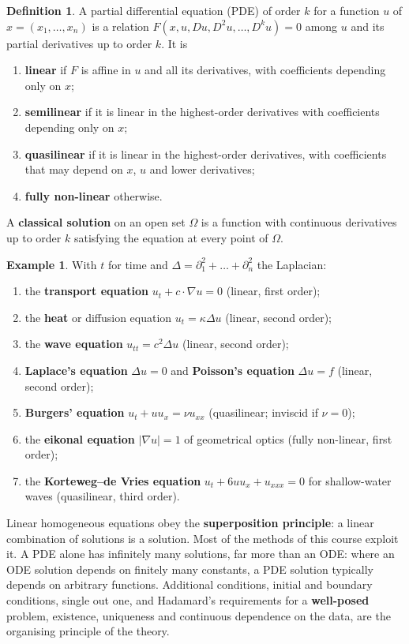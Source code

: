 \documentclass[11pt,a4paper]{article}
\numberwithin{equation}{section}
\theoremstyle{definition}
\newtheorem{defn}[thm]{Definition}
\newtheorem{exa}[thm]{Example}
\begin{document}
\begin{defn}
A partial differential equation (PDE) of order $k$ for a function $u$ of $x = (x_1, \dots, x_n)$ is a relation $F(x, u, Du, D^2u, \dots, D^ku) = 0$ among $u$ and its partial derivatives up to order $k$. It is
\begin{enumerate}[label=(\roman*)]
\item \textbf{linear} if $F$ is affine in $u$ and all its derivatives, with coefficients depending only on $x$;
\item \textbf{semilinear} if it is linear in the highest-order derivatives with coefficients depending only on $x$;
\item \textbf{quasilinear} if it is linear in the highest-order derivatives, with coefficients that may depend on $x$, $u$ and lower derivatives;
\item \textbf{fully non-linear} otherwise.
\end{enumerate}
A \textbf{classical solution} on an open set $\Omega$ is a function with continuous derivatives up to order $k$ satisfying the equation at every point of $\Omega$.
\end{defn}

\begin{exa}
\label{ex:pdes}
With $t$ for time and $\Delta = \partial_1^2 + \dots + \partial_n^2$ the Laplacian:
\begin{enumerate}[label=(\alph*)]
\item the \textbf{transport equation} $u_t + c\cdot\nabla u = 0$ (linear, first order);
\item the \textbf{heat} or diffusion equation $u_t = \kappa\Delta u$ (linear, second order);
\item the \textbf{wave equation} $u_{tt} = c^2\Delta u$ (linear, second order);
\item \textbf{Laplace's equation} $\Delta u = 0$ and \textbf{Poisson's equation} $\Delta u = f$ (linear, second order);
\item \textbf{Burgers' equation} $u_t + uu_x = \nu u_{xx}$ (quasilinear; inviscid if $\nu = 0$);
\item the \textbf{eikonal equation} $|\nabla u| = 1$ of geometrical optics (fully non-linear, first order);
\item the \textbf{Korteweg--de Vries equation} $u_t + 6uu_x + u_{xxx} = 0$ for shallow-water waves (quasilinear, third order).
\end{enumerate}
\end{exa}

Linear homogeneous equations obey the \textbf{superposition principle}: a linear combination of solutions is a solution. Most of the methods of this course exploit it. A PDE alone has
infinitely many solutions, far more than an ODE: where an ODE solution depends on finitely many constants, a PDE solution typically depends on arbitrary functions. Additional
conditions, initial and boundary conditions, single out one, and Hadamard's requirements for a \textbf{well-posed} problem, existence, uniqueness and continuous dependence on the data,
are the organising principle of the theory.
\end{document}
